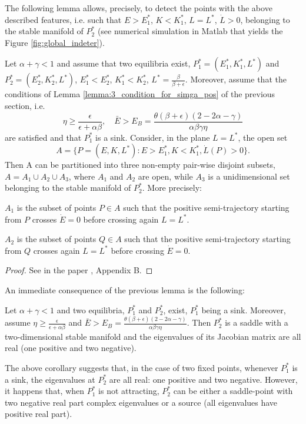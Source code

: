 The following lemma allows, precisely, to detect the points with the above described features, i.e. such that $E > E_1^*$, $K < K_1^*$, $L = L^*$, $\dot{L}>0$, belonging to the stable manifold of $P_2^*$ (see numerical simulation in Matlab that yields the Figure \ref{fig:global_indeter}).
\begin{lemma}\label{lemma:7_subdivision_of_phase_space}
	Let $\alpha+\gamma<1$ and assume that two equilibria exist, $P_1^* = (E_1^*, K_1^*, L^*)$ and $P_2^* = (E_2^*, K_2^*, L^*)$, $E_1^* < E_2^*$, $K_1^* < K_2^*$, $L^*=\frac{\beta}{\beta+\epsilon}$. Moreover, assume that the conditions of Lemma \ref{lemma:3_condition_for_simga_pos} of the previous section, i.e. $$\eta\geq \frac{\epsilon}{\epsilon+\alpha\beta},\quad  \bar{E}>E_B=\frac{\theta(\beta+\epsilon)(2-2\alpha-\gamma)}{\alpha\beta\gamma\eta}$$ are satisfied and that $P_1^*$ is a sink. Consider, in the plane $L=L^*$, the open set
	$$A = \{P = (E,K,L^*): E > E_1^*, K < K_1^*, \dot{L}(P)>0\}.$$
	Then A can be partitioned into three non-empty pair-wise disjoint subsets, $A=A_1 \cup A_2 \cup A_3$, where $A_1$ and $A_2$ are open, while $A_3$ is a unidimensional set belonging to the stable manifold of $P_2^*$. More precisely:
	
	$A_1$ is the subset of points $P\in A$ such that the positive semi-trajectory starting from $P$ crosses $\dot{E}=0$ before crossing again $L = L^*$.
	
	$A_2$ is the subset of points $Q\in A$ such that the positive semi-trajectory starting from $Q$ crosses again $L = L^*$ before crossing $\dot{E}=0$.
\end{lemma}
\begin{proof}
	See in the paper \cite{antoci_poverty_2011}, Appendix B.
\end{proof}
An immediate consequence of the previous lemma is the following:
\begin{corollary}
	Let $\alpha+\gamma<1$ and two equilibria, $P_1^*$ and $P_2^*$, exist, $P_1^*$ being a sink. Moreover, assume $\eta\geq \frac{\epsilon}{\epsilon+\alpha\beta}$ and $\bar{E}>E_B=\frac{\theta(\beta+\epsilon)(2-2\alpha-\gamma)}{\alpha\beta\gamma\eta}$. Then $P_2^*$ is a saddle with a two-dimensional stable manifold and the eigenvalues of its Jacobian matrix are all real (one positive and two negative).
\end{corollary}
\begin{remark}
	\textup{The above corollary suggests that, in the case of two fixed points, whenever $P_1^*$ is a sink, the eigenvalues at $P_2^*$ are all real: one positive and two negative. However, it happens that, when $P_1^*$ is not attracting, $P_2^*$ can be either a saddle-point with two negative real part complex eigenvalues or a source (all eigenvalues have positive real part).}
\end{remark}
